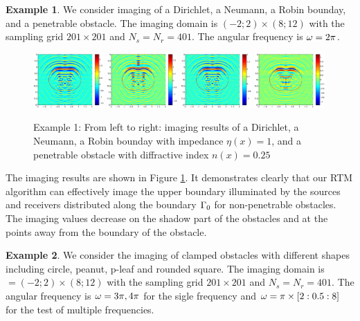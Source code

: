 \documentclass[11pt]{iopart}
\begin{document}
\bigskip
\textbf{Example 1}.
We consider imaging of a Dirichlet, a Neumann, a Robin bounday, and a penetrable obstacle. The imaging domain is $(−2; 2) \times (8; 12)$ with the sampling grid $201 \times 201$ and $N_s = N_r = 401$. The angular frequency is $\omega=2\pi$.
 \begin{figure}
 	\centering
 	\includegraphics[width=0.24\textwidth]{./graphic/peanut_3pi.eps}
 	\includegraphics[width=0.24\textwidth]{./graphic/peanut_3pi_neumann.eps}
 	\includegraphics[width=0.24\textwidth]{./graphic/peanut_3pi_impedance_1.eps}
 	\includegraphics[width=0.24\textwidth]{./graphic/peanut_3pi_transmission.eps}
 	\caption{Example 1: From left to right: imaging results of a Dirichlet, a Neumann, a Robin bounday with impedance $\eta(x)=1$, and a penetrable obstacle with diffractive index $n(x)=0.25$}\label{figure_1}
 \end{figure}
 
 The imaging results are shown in Figure \ref{figure_1}. It demonstrates clearly that our RTM
 algorithm can effectively image the upper boundary illuminated by the sources and
 receivers distributed along the boundary $\Gamma_0$ for non-penetrable obstacles. The imaging
 values decrease on the shadow part of the obstacles and at the points away from the
 boundary of the obstacle.

\bigskip
\textbf{Example 2}. We consider the imaging of clamped obstacles with different shapes including circle, peanut, p-leaf and rounded square. The imaging domain is $ = (−2; 2) \times (8; 12)$ with the sampling grid $201 \times 201$ and $N_s = N_r = 401$. The angular frequency is $\omega = 3\pi,4\pi$ for the sigle frequency and $\omega=\pi\times[2:0.5:8]$ for the test of multiple frequencies.
\end{document}
